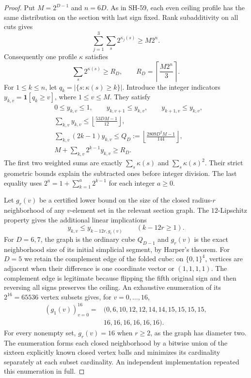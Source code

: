 \begin{proof}
Put $M=2^{D-1}$ and $n=6D$.  As in SH-59, each
even ceiling profile has the same distribution on
the section with last sign fixed.  Rank subadditivity
on all cuts gives
\[
 \sum_{j=1}^3\sum_s2^{\kappa_j(s)}\geq M2^n.
\]
Consequently one profile $\kappa$ satisfies
\[
 \sum_s2^{\kappa(s)}\geq R_D,
 \qquad R_D=\left\lceil\frac{M2^n}{3}\right\rceil.
 \tag{SH-60.1}
\]
For $1\leq k\leq n$, let
$q_k=|\{s:\kappa(s)\geq k\}|$.  Introduce the
integer indicators $y_{k,v}=\mathbf1[q_k\geq v]$,
where $1\leq v\leq M$.  They satisfy
\[
\begin{split}
 &0\leq y_{k,v}\leq1,\qquad
 y_{k,v+1}\leq y_{k,v},\qquad
 y_{k+1,v}\leq y_{k,v},\\
 &\sum_{k,v}y_{k,v}\leq
       \left\lfloor\frac{53DM-1}{12}\right\rfloor,\\
 &\sum_{k,v}(2k-1)y_{k,v}\leq
       Q_D:=\left\lfloor\frac{2809D^2M-1}{144}\right\rfloor,\\
 &M+\sum_{k,v}2^{k-1}y_{k,v}\geq R_D.
\end{split}
 \tag{SH-60.2}
\]
The first two weighted sums are exactly
$\sum_s\kappa(s)$ and $\sum_s\kappa(s)^2$.
Their strict geometric bounds explain the subtracted
ones before integer division.  The last equality
uses $2^a=1+\sum_{k=1}^a2^{k-1}$ for each integer
$a\geq0$.

Let $g_r(v)$ be a certified lower bound on the size
of the closed radius-$r$ neighborhood of any
$v$-element set in the relevant section graph.
The $12$-Lipschitz property gives the additional
linear implications
\[
       y_{k,v}\leq y_{k-12r,g_r(v)}
       \qquad(k-12r\geq1).
 \tag{SH-60.3}
\]
For $D=6,7$, the graph is the ordinary cube
$Q_{D-1}$ and $g_r(v)$ is the exact neighborhood
size of its initial simplicial segment, by Harper's
theorem.  For $D=5$ we retain the complement edge
of the folded cube: on $\{0,1\}^4$, vertices are
adjacent when their difference is one coordinate
vector or $(1,1,1,1)$.  The complement edge is
legitimate because flipping the fifth original sign
and then reversing all signs preserves the ceiling.
An exhaustive enumeration of its $2^{16}=65536$
vertex subsets gives, for $v=0,\ldots,16$,
\[
\begin{split}
 (g_1(v))_{v=0}^{16}
   ={}&(0,6,10,12,12,14,14,15,15,15,15,\\
       &16,16,16,16,16,16).
\end{split}
 \tag{SH-60.4}
\]
For every nonempty set, $g_r(v)=16$ when $r\geq2$,
as the graph has diameter two.  The enumeration
forms each closed neighborhood by a bitwise union
of the sixteen explicitly known closed vertex balls
and minimizes its cardinality separately at each
subset cardinality.  An independent implementation
repeated this enumeration in full.


\end{proof}
